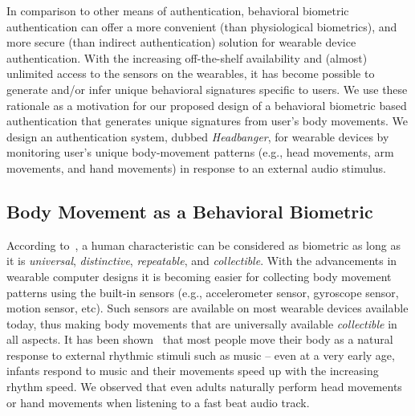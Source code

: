 In comparison to other means of authentication, behavioral biometric
authentication can offer a more convenient (than physiological biometrics),
and more secure (than indirect authentication) solution for wearable device
authentication. With the increasing off-the-shelf
availability and (almost) unlimited access to the sensors on the wearables, it
has become possible to generate and/or infer unique behavioral signatures
specific to users. We use these rationale as a motivation for our proposed
design of a behavioral biometric based authentication that generates unique
signatures from user's body movements.
We design an authentication system, dubbed {\em Headbanger}, for wearable
devices by monitoring user's unique body-movement patterns (e.g., head movements, arm movements, and hand movements) in response to an
external audio stimulus.


\subsection{Body Movement as a Behavioral Biometric}
\label{subsec:headmovements}


According to~\cite{jain2004introduction}, a human characteristic can be
considered as biometric as long as it is \emph{universal}, \emph{distinctive},
\emph{repeatable}, and \emph{collectible}. With the advancements in
wearable computer designs it is becoming easier for collecting body movement
patterns using the built-in sensors (e.g., accelerometer sensor, gyroscope sensor, motion sensor, etc). Such sensors are
available on most wearable devices available today, thus
making body movements that are universally available {\em collectible} in all
aspects. It has been shown~\cite{zentner2010rhythmic} that most people move
their body as a natural response to external rhythmic stimuli such as music --
even at a very early age, infants respond to music and their movements speed
up with the increasing rhythm speed. We observed that even adults naturally
perform head movements or hand movements when listening to a fast beat audio track.

